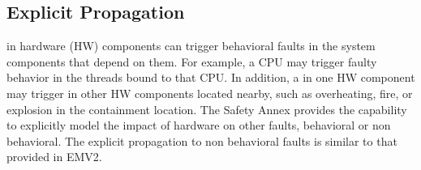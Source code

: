 \subsection{Explicit %
	 Propagation} 
 in hardware (HW) components can trigger behavioral faults in the system components that depend on them. For example, a CPU %
 may trigger faulty behavior in the threads bound to that CPU. In addition, a %
 in one HW component may trigger %
 in other HW components located nearby, such as overheating, fire, or explosion
in the containment location. 
The Safety Annex provides the capability to explicitly model the impact of hardware %
 on other faults, behavioral or non behavioral. The explicit propagation to non behavioral faults is similar to that provided in EMV2.

